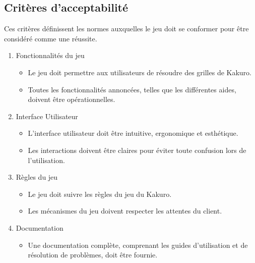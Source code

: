 \subsection{Critères d’acceptabilité}
Ces critères définissent les normes auxquelles le jeu doit se conformer pour être considéré comme une réussite.
\begin{enumerate}
    \item Fonctionnalités du jeu
    \begin{itemize}
        \item Le jeu doit permettre aux utilisateurs de résoudre des grilles de Kakuro.
        \item Toutes les fonctionnalités annoncées, telles que les différentes aides, doivent être opérationnelles.
    \end{itemize}
    \item Interface Utilisateur
    \begin{itemize}
        \item L'interface utilisateur doit être intuitive, ergonomique et esthétique.
        \item Les interactions doivent être claires pour éviter toute confusion lors de l'utilisation.
    \end{itemize}
    \item Règles du jeu
    \begin{itemize}
        \item Le jeu doit suivre les règles du jeu du Kakuro.
        \item Les mécanismes du jeu doivent respecter les attentes du client.
    \end{itemize}
    \item Documentation
    \begin{itemize}
        \item Une documentation complète, comprenant les guides d'utilisation et de résolution de problèmes, doit être fournie.
    \end{itemize}
\end{enumerate}

